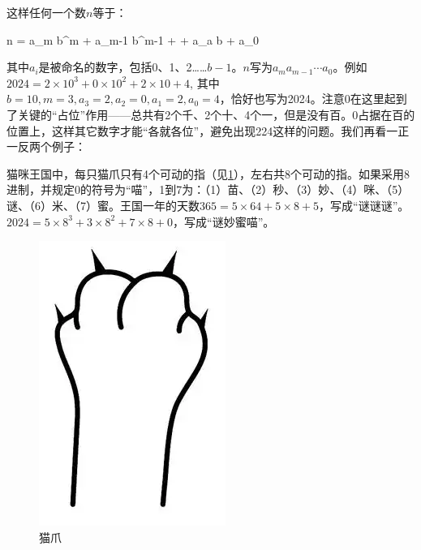 \documentclass[b5paper]{ctexart}
\begin{document}
这样任何一个数$n$等于：

\be
n = a_m b^m + a_{m-1} b^{m-1} + \cdots + a_a b + a_0
\label{eq:pos-rep}
\ee

其中$a_i$是被命名的数字，包括0、1、2……$b-1$。$n$写为$a_ma_{m-1} \cdots a_0$。例如$2024 = 2 \times 10^3 + 0 \times 10^2 + 2 \times 10 + 4$, 其中$b = 10, m = 3, a_3 = 2, a_2 = 0, a_1 = 2, a_0 = 4$，恰好也写为2024。注意0在这里起到了关键的“占位”作用——总共有2个千、2个十、4个一，但是没有百。0占据在百的位置上，这样其它数字才能“各就各位”，避免出现224这样的问题。我们再看一正一反两个例子：

\begin{example}
猫咪王国中，每只猫爪只有4个可动的指（见\cref{fig:cat-paw}），左右共8个可动的指。如果采用8进制，并规定0的符号为“喵”，1到7为：（1）苗、（2）秒、（3）妙、（4）咪、（5）谜、（6）米、（7）蜜。王国一年的天数$365 = 5 \times 64 + 5 \times 8 + 5$，写成“谜谜谜”。$2024 = 5 \times 8^3 + 3 \times 8^2 + 7 \times 8 + 0$，写成“谜妙蜜喵”。

\begin{figure}[htbp]
 \centering
 \includegraphics[scale=0.6]{img/cat-paw}
 \caption{猫爪}
 \label{fig:cat-paw}
\end{figure}

\end{example}
\end{document}
